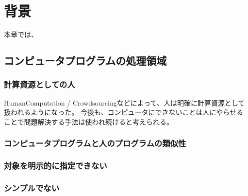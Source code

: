 \chapter{背景}
\label{chap:background}

本章では、

\section{コンピュータプログラムの処理領域}

\subsection{計算資源としての人}
HumanComputation / Crowdsourcingなどによって、人は明確に計算資源として扱われるようになった。
今後も、コンピュータにできないことは人にやらせることで問題解決する手法は使われ続けると考えられる。

\subsection{コンピュータプログラムと人のプログラムの類似性}

\subsection{}

\subsection{対象を明示的に指定できない}
\subsection{シンプルでない}

%
